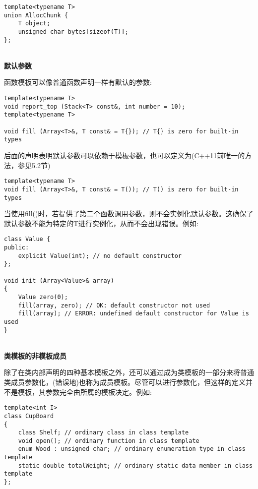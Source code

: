 \begin{lstlisting}[style=styleCXX]
template<typename T>
union AllocChunk {
	T object;
	unsigned char bytes[sizeof(T)];
};
\end{lstlisting}

\hspace*{\fill} \\ %
\noindent
\textbf{默认参数}

函数模板可以像普通函数声明一样有默认的参数:

\begin{lstlisting}[style=styleCXX]
template<typename T>
void report_top (Stack<T> const&, int number = 10);
template<typename T>

void fill (Array<T>&, T const& = T{}); // T{} is zero for built-in types
\end{lstlisting}

后面的声明表明默认参数可以依赖于模板参数，也可以定义为(C++11前唯一的方法，参见5.2节)

\begin{lstlisting}[style=styleCXX]
template<typename T>
void fill (Array<T>&, T const& = T()); // T() is zero for built-in types
\end{lstlisting}

当使用fill()时，若提供了第二个函数调用参数，则不会实例化默认参数。这确保了默认参数不能为特定的T进行实例化，从而不会出现错误。例如:

\begin{lstlisting}[style=styleCXX]
class Value {
public:
	explicit Value(int); // no default constructor
};

void init (Array<Value>& array)
{
	Value zero(0);
	fill(array, zero); // OK: default constructor not used
	fill(array); // ERROR: undefined default constructor for Value is used
}
\end{lstlisting}

\hspace*{\fill} \\ %
\noindent
\textbf{类模板的非模板成员}

除了在类内部声明的四种基本模板之外，还可以通过成为类模板的一部分来将普通类成员参数化，(错误地)也称为成员模板。尽管可以进行参数化，但这样的定义并不是模板，其参数完全由所属的模板决定。例如:

\begin{lstlisting}[style=styleCXX]
template<int I>
class CupBoard
{
	class Shelf; // ordinary class in class template
	void open(); // ordinary function in class template
	enum Wood : unsigned char; // ordinary enumeration type in class template
	static double totalWeight; // ordinary static data member in class template
};
\end{lstlisting}

